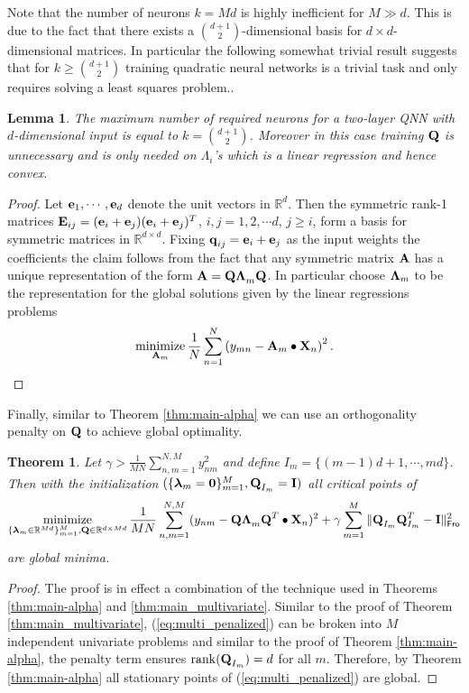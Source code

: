 \documentclass[11pt]{article}
\theoremstyle{plain}
\newtheorem{lemma}{Lemma}
\newtheorem{theorem}{Theorem}
\DeclareMathOperator*{\minimize}{minimize}
\DeclareMathOperator*{\rank}{rank}
\def\R{\mathbb{R}}
\theoremstyle{plain}
\numberwithin{equation}{section}
\numberwithin{lemma}{section}
\numberwithin{theorem}{section}
\numberwithin{corollary}{section}
\numberwithin{observation}{section}
\numberwithin{definition}{section}
\numberwithin{example}{section}
\begin{document}
\noindent Note that the number of neurons $k = Md$ is highly inefficient for $M \gg d$. This is due to the fact that there exists a $\binom{d+1}{2}$-dimensional basis for $d \times d$-dimensional matrices. In particular the following somewhat trivial result suggests that for $k \geq \binom{d+1}{2}$ training quadratic neural networks is a trivial task and only requires solving a least squares problem..
\begin{lemma} \label{lem:maxK} The maximum number of required neurons for a two-layer QNN with $d$-dimensional input is equal to $k = \binom{d+1}{2}$. Moreover in this case training $\Mx{Q}$ is unnecessary and is only needed on $\Lambda_i$'s which is a linear regression and hence convex.
\end{lemma}
\begin{proof}
Let $\V{e}_1, \cdots, \V{e}_d$ denote the unit vectors in $\mathbb{R}^d$. Then the symmetric rank-1 matrices $\Mx{E}_{ij} = (\V{e}_i+\V{e}_j)(\V{e}_i+\V{e}_j)^T$, $i,j = 1,2, \cdots d$, $j\geq i$, form a basis for symmetric matrices in $\mathbb{R}^{d \times d}$. Fixing $\V{q}_{ij} =\V{e}_i + \V{e}_j$ as the input weights the coefficients the claim follows from the fact that any symmetric matrix $\Mx{A}$ has a unique representation of the form $\Mx{A} = \Mx{Q \Lambda}_m \Mx{Q}$. In particular choose $\Mx{\Lambda}_m$ to be the representation for the global solutions given by the linear regressions problems
\begin{equation} \label{eq:cvx2}
\minimize_{\Mx{A}_m} \frac{1}{N} \sum_{n = 1}^N \left(y_{mn} - \Mx{A}_m \bullet \Mx{X}_n \right)^2.
\end{equation}
\end{proof}

\noindent Finally, similar to Theorem \ref{thm:main-alpha} we can use an orthogonality penalty on $\Mx{Q}$ to achieve global optimality.

\begin{theorem} \label{thm:multi_penalized} Let $\gamma > \frac{1}{MN}\sum_{n, m=1}^{N,M} y_{nm}^2$ and define
$I_m = \{(m-1)d+1,\cdots, md\}$.
Then with the initialization $(\{\V{\lambda}_m = \Mx{0}\}_{m=1}^M,\Mx{Q}_{I_m}=\Mx{I})$ all critical points of
\begin{equation} \label{eq:multi_penalized}
\minimize_{\{\V{\lambda}_m \in \R^{Md}\}_{m=1}^M,\Mx{Q} \in \R^{d \times Md}}
\frac{1}{MN}\sum_{n,m=1}^{N,M} ( y_{nm}-\Mx{Q \Lambda}_m\Mx{Q}^T \bullet \Mx{X}_n)^2 + \gamma \sum_{m=1}^M  \|\Mx{Q}_{I_m}\Mx{Q}_{I_m}^T-\Mx{I}\|_{\sf Fro}^2    
\end{equation}
are global minima.
\end{theorem}
\begin{proof}
The proof is in effect a combination of the technique used in Theorems \ref{thm:main-alpha} and \ref{thm:main_multivariate}.
Similar to the proof of Theorem \ref{thm:main_multivariate}, (\ref{eq:multi_penalized}) can be broken into $M$ independent univariate problems and similar to the proof of Theorem \ref{thm:main-alpha}, the penalty term ensures $\rank(\Mx{Q}_{I_m}) = d$ for all $m$. Therefore, by Theorem \ref{thm:main-alpha} all stationary points of (\ref{eq:multi_penalized}) are global.
\end{proof} \label{app:deep}
\end{document}
